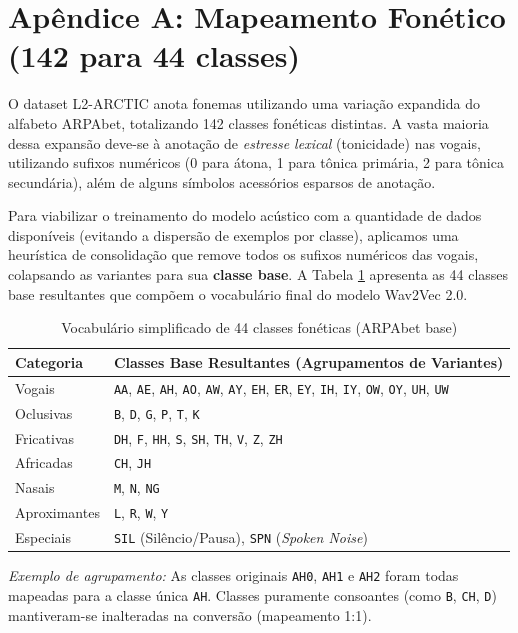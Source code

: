 \documentclass[12pt]{article}
\begin{document}



\appendix

\section{Apêndice A: Mapeamento Fonético (142 para 44 classes)} \label{apendice:mapeamento}

O dataset L2-ARCTIC anota fonemas utilizando uma variação expandida do alfabeto ARPAbet, totalizando 142 classes fonéticas distintas. A vasta maioria dessa expansão deve-se à anotação de \textit{estresse lexical} (tonicidade) nas vogais, utilizando sufixos numéricos (0 para átona, 1 para tônica primária, 2 para tônica secundária), além de alguns símbolos acessórios esparsos de anotação.

Para viabilizar o treinamento do modelo acústico com a quantidade de dados disponíveis (evitando a dispersão de exemplos por classe), aplicamos uma heurística de consolidação que remove todos os sufixos numéricos das vogais, colapsando as variantes para sua \textbf{classe base}. A Tabela \ref{tab:mapeamento} apresenta as 44 classes base resultantes que compõem o vocabulário final do modelo Wav2Vec 2.0.

\begin{table}[H]
\centering
\caption{Vocabulário simplificado de 44 classes fonéticas (ARPAbet base)}
\label{tab:mapeamento}
\begin{tabular}{@{}ll@{}}
\toprule
\textbf{Categoria} & \textbf{Classes Base Resultantes (Agrupamentos de Variantes)} \\
\midrule
Vogais & \texttt{AA}, \texttt{AE}, \texttt{AH}, \texttt{AO}, \texttt{AW}, \texttt{AY}, \texttt{EH}, \texttt{ER}, \texttt{EY}, \texttt{IH}, \texttt{IY}, \texttt{OW}, \texttt{OY}, \texttt{UH}, \texttt{UW} \\
\midrule
Oclusivas & \texttt{B}, \texttt{D}, \texttt{G}, \texttt{P}, \texttt{T}, \texttt{K} \\
\midrule
Fricativas & \texttt{DH}, \texttt{F}, \texttt{HH}, \texttt{S}, \texttt{SH}, \texttt{TH}, \texttt{V}, \texttt{Z}, \texttt{ZH} \\
\midrule
Africadas & \texttt{CH}, \texttt{JH} \\
\midrule
Nasais & \texttt{M}, \texttt{N}, \texttt{NG} \\
\midrule
Aproximantes & \texttt{L}, \texttt{R}, \texttt{W}, \texttt{Y} \\
\midrule
Especiais & \texttt{SIL} (Silêncio/Pausa), \texttt{SPN} (\textit{Spoken Noise}) \\
\bottomrule
\end{tabular}
\end{table}

\textit{Exemplo de agrupamento:} As classes originais \texttt{AH0}, \texttt{AH1} e \texttt{AH2} foram todas mapeadas para a classe única \texttt{AH}. Classes puramente consoantes (como \texttt{B}, \texttt{CH}, \texttt{D}) mantiveram-se inalteradas na conversão (mapeamento 1:1).
\end{document}
